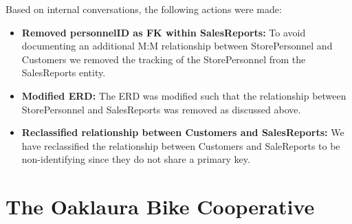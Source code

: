 \documentclass{article}
\begin{document}
\begin{tcolorbox}[colback=secondarycolor, colframe=primarycolor, arc=5mm]
Based on internal conversations, the following actions were made:
\begin{itemize}
  \item \textbf{Removed personnelID as FK within SalesReports:} To avoid documenting an additional M:M relationship between StorePersonnel and Customers we removed the tracking of the StorePersonnel from the SalesReports entity.
  \item \textbf{Modified ERD:} The ERD was modified such that the relationship between StorePersonnel and SalesReports was removed as discussed above.
  \item \textbf{Reclassified relationship between Customers and SalesReports:} We have reclassified the relationship between Customers and SaleReports to be non-identifying since they do not share a primary key.
  \end{itemize}
\vspace{0.2cm}

\end{tcolorbox}

\section{The Oaklaura Bike Cooperative}
\end{document}
